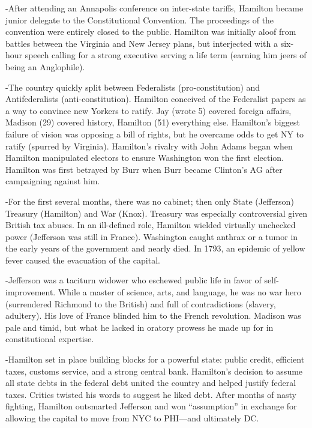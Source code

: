 \documentclass[
]{article}
\begin{document}
-After attending an Annapolis conference on inter-state tariffs,
Hamilton became junior delegate to the Constitutional Convention. The
proceedings of the convention were entirely closed to the public.
Hamilton was initially aloof from battles between the Virginia and New
Jersey plans, but interjected with a six-hour speech calling for a
strong executive serving a life term (earning him jeers of being an
Anglophile).

-The country quickly split between Federalists (pro-constitution) and
Antifederalists (anti-constitution). Hamilton conceived of the
Federalist papers as a way to convince new Yorkers to ratify. Jay (wrote
5) covered foreign affairs, Madison (29) covered history, Hamilton (51)
everything else. Hamilton's biggest failure of vision was opposing a
bill of rights, but he overcame odds to get NY to ratify (spurred by
Virginia). Hamilton's rivalry with John Adams began when Hamilton
manipulated electors to ensure Washington won the first election.
Hamilton was first betrayed by Burr when Burr became Clinton's AG after
campaigning against him.

-For the first several months, there was no cabinet; then only State
(Jefferson) Treasury (Hamilton) and War (Knox). Treasury was especially
controversial given British tax abuses. In an ill-defined role, Hamilton
wielded virtually unchecked power (Jefferson was still in France).
Washington caught anthrax or a tumor in the early years of the
government and nearly died. In 1793, an epidemic of yellow fever caused
the evacuation of the capital.

-Jefferson was a taciturn widower who eschewed public life in favor of
self-improvement. While a master of science, arts, and language, he was
no war hero (surrendered Richmond to the British) and full of
contradictions (slavery, adultery). His love of France blinded him to
the French revolution. Madison was pale and timid, but what he lacked in
oratory prowess he made up for in constitutional expertise.

-Hamilton set in place building blocks for a powerful state: public
credit, efficient taxes, customs service, and a strong central bank.
Hamilton's decision to assume all state debts in the federal debt united
the country and helped justify federal taxes. Critics twisted his words
to suggest he liked debt. After months of nasty fighting, Hamilton
outsmarted Jefferson and won ``assumption'' in exchange for allowing the
capital to move from NYC to PHI---and ultimately DC.
\end{document}
